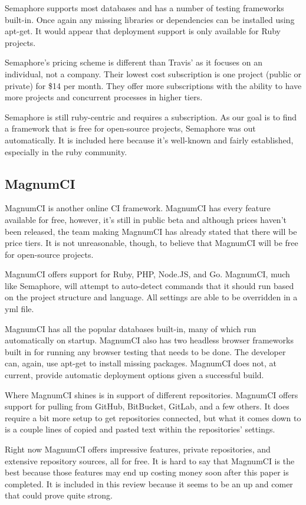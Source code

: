 \documentclass[12pt]{ucthesis}
\begin{document}
Semaphore supports most databases and has a number of testing frameworks built-in. Once again any missing libraries or dependencies can be installed using apt-get. It would appear that deployment support is only available for Ruby projects.

Semaphore's pricing scheme is different than Travis' as it focuses on an individual, not a company. Their lowest cost subscription is one project (public or private) for \$14 per month. They offer more subscriptions with the ability to have more projects and concurrent processes in higher tiers.

Semaphore is still ruby-centric and requires a subscription. As our goal is to find a framework that is free for open-source projects, Semaphore was out automatically. It is included here because it's well-known and fairly established, especially in the ruby community.

\subsection{MagnumCI}
MagnumCI\cite{MagnumCI} is another online CI framework. MagnumCI has every feature available for free, however, it's still in public beta and although prices haven't been released, the team making MagnumCI has already stated that there will be price tiers. It is not unreasonable, though, to believe that MagnumCI will be free for open-source projects.

MagnumCI offers support for Ruby, PHP, Node.JS, and Go. MagnumCI, much like Semaphore, will attempt to auto-detect commands that it should run based on the project structure and language. All settings are able to be overridden in a yml file.

MagnumCI has all the popular databases built-in, many of which run automatically on startup. MagnumCI also has two headless browser frameworks built in for running any browser testing that needs to be done. The developer can, again, use apt-get to install missing packages. MagnumCI does not, at current, provide automatic deployment options given a successful build.

Where MagnumCI shines is in support of different repositories. MagnumCI offers support for pulling from GitHub, BitBucket, GitLab, and a few others. It does require a bit more setup to get repositories connected, but what it comes down to is a couple lines of copied and pasted text within the repositories' settings.

Right now MagnumCI offers impressive features, private repositories, and extensive repository sources, all for free. It is hard to say that MagnumCI is the best because those features may end up costing money soon after this paper is completed. It is included in this review because it seems to be an up and comer that could prove quite strong.
\end{document}
